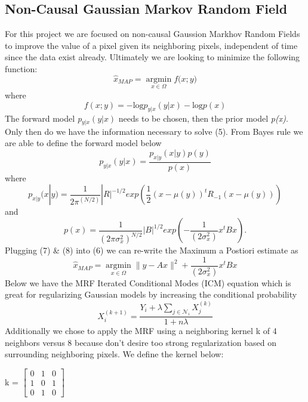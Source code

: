 \documentclass[conference]{IEEEtran}
\begin{document}
\subsection{Non-Causal Gaussian Markov Random Field} %
\par For this project we are focused on non-causal Gaussion Markhov Random Fields to improve the value of a pixel given its neighboring pixels, independent of time since the data exist already. Ultimately we are looking to minimize the following function:
\begin{equation}
    \hat{x}_{MAP} = \operatorname*{argmin}_{x\in\Omega} {f(x;y})
\end{equation}
where
\begin{equation}
    f(x;y) = -\text{log}p_{y|x}(y|x) -\text{log}p(x)
\end{equation}
The forward model \emph{p$_{y|x}(y|x)$} needs to be chosen, then the prior model \emph{p(x)}\cite{b6}. Only then do we have the information necessary to solve (5). From Bayes rule we are able to define the forward model below
\begin{equation}
    p_{y|x}(y|x) = \frac{p_{x|y}(x|y)p(y)}{p(x)}
\end{equation}
where 
\begin{equation}
    p_{x|y}(x|y) = \frac{1}{2\pi^{(N/2)}}|R|^{-1/2}exp(\frac{1}{2}(x-\mu(y))^tR_{-1}(x-\mu(y)))
\end{equation}
and 
\begin{equation}
    p(x) = \frac{1}{(2\pi\sigma^2_x)^{N/2}}|B|^{1/2}exp(-\frac{1}{(2\sigma^2_x)}x^tBx).
\end{equation}
Plugging (7) \& (8) into (6) we can re-write the Maximum a Postiori estimate as
\begin{equation}
    \hat{x}_{MAP} = \operatorname*{argmin}_{x\in\Omega} {\|y-Ax\|^2 + \frac{1}{(2\sigma^2_x)}x^tBx}
\end{equation}
Below we have the MRF Iterated Conditional Modes (ICM) equation which is great for regularizing Gaussian models by increasing the conditional probability\cite{b9mrf}
\begin{equation}
X_{i}^{(k+1)} = \frac{Y_i + \lambda \sum_{j \in \mathcal{N}_i} X_j^{(k)}}{1 + n\lambda}
\end{equation}
Additionally we chose to apply the MRF using a neighboring kernel k of 4 neighbors versus 8 because don't desire too strong regularization based on surrounding neighboring pixels. We define the kernel below:\\
\begin{center}
    k = $\begin{bmatrix} 
0 & 1 & 0 \\ 
1 & 0 & 1 \\ 
0 & 1 & 0 
\end{bmatrix}$\\
\end{center}
\end{document}
